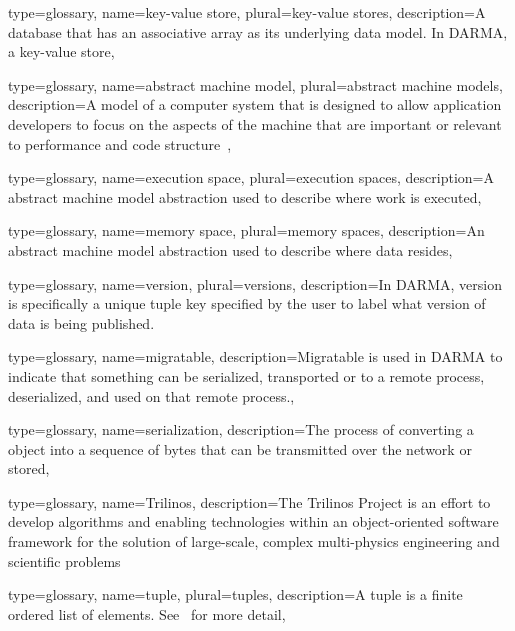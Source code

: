 {
  type=glossary,
  name={key-value store},
  plural={key-value stores},
  description={A database that has an \gls{associative array} as its underlying
    data model.  In DARMA, a key-value store},
}

{
  type=glossary,
  name={abstract machine model},
  plural={abstract machine models},
  description={A model of a computer system that is designed to allow
    application developers to focus on the aspects of the machine that are
      important or relevant to performance and code
      structure~\cite{AbstractMachine}},
}

{
  type=glossary,
  name={execution space},
  plural={execution spaces},
  description={A \gls{abstract machine model} abstraction used to describe where work is executed},
}

{
  type=glossary,
  name={memory space},
  plural={memory spaces},
  description={An \gls{abstract machine model} abstraction used to describe
    where data resides},
}

{
  type=glossary,
  name=version,
  plural=versions,
  description={In DARMA, version is specifically a unique tuple key specified by the user to label what
    version of data is being \gls{publish}ed.}
}

{
  type=glossary,
  name=migratable,
  description={Migratable is used in DARMA to indicate that something can be serialized,
   transported or to a remote process, deserialized, and used on that remote process.},
}

{
  type=glossary,
  name=serialization,
  description={The process of converting a \CC{} object into a sequence of bytes that
    can be transmitted over the network or stored}, 
}



{
  type=glossary,
  name=Trilinos,
  description={The Trilinos Project is an effort to develop algorithms and
    enabling technologies within an object-oriented software framework for the
      solution of large-scale, complex multi-physics engineering and scientific
      problems~\cite{trilinos}}
}

{
  type={glossary},
  name={tuple},
  plural={tuples},
  description={A tuple is a finite ordered list of elements.  See~\cite{tuple}
  for more detail},
}

